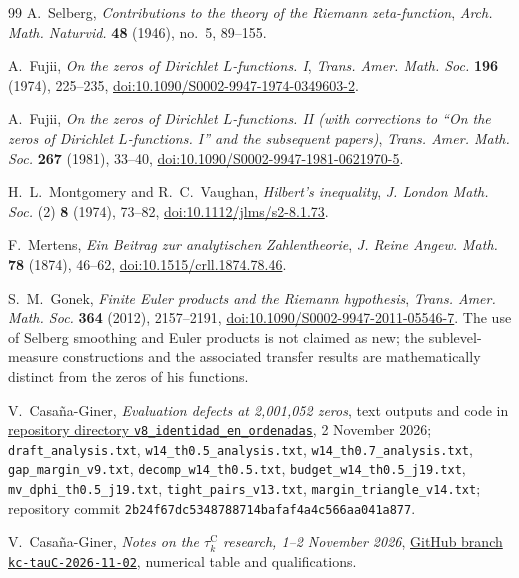 \documentclass[11pt,a4paper]{article}
\numberwithin{equation}{section}
\theoremstyle{definition}
\theoremstyle{remark}
\begin{document}
\begin{thebibliography}{99}
A.~Selberg, \emph{Contributions to the theory of the Riemann zeta-function}, \emph{Arch. Math. Naturvid.} \textbf{48} (1946), no.~5, 89--155.

A.~Fujii, \emph{On the zeros of Dirichlet $L$-functions. I}, \emph{Trans. Amer. Math. Soc.} \textbf{196} (1974), 225--235, \href{https://doi.org/10.1090/S0002-9947-1974-0349603-2}{doi:10.1090/S0002-9947-1974-0349603-2}.

A.~Fujii, \emph{On the zeros of Dirichlet $L$-functions. II (with corrections to ``On the zeros of Dirichlet $L$-functions. I'' and the subsequent papers)}, \emph{Trans. Amer. Math. Soc.} \textbf{267} (1981), 33--40, \href{https://doi.org/10.1090/S0002-9947-1981-0621970-5}{doi:10.1090/S0002-9947-1981-0621970-5}.

H.~L.~Montgomery and R.~C.~Vaughan, \emph{Hilbert's inequality}, \emph{J. London Math. Soc.} (2) \textbf{8} (1974), 73--82, \href{https://doi.org/10.1112/jlms/s2-8.1.73}{doi:10.1112/jlms/s2-8.1.73}.

F.~Mertens, \emph{Ein Beitrag zur analytischen Zahlentheorie}, \emph{J. Reine Angew. Math.} \textbf{78} (1874), 46--62, \href{https://doi.org/10.1515/crll.1874.78.46}{doi:10.1515/crll.1874.78.46}.

S.~M.~Gonek, \emph{Finite Euler products and the Riemann hypothesis},
\emph{Trans. Amer. Math. Soc.} \textbf{364} (2012), 2157--2191,
\href{https://doi.org/10.1090/S0002-9947-2011-05546-7}{doi:10.1090/S0002-9947-2011-05546-7}.
The use of Selberg smoothing and Euler products is not claimed as new;
the sublevel-measure constructions and the associated transfer results
are mathematically distinct from the zeros of his functions.

V.~Casa\~na-Giner, \emph{Evaluation defects at 2,001,052 zeros},
text outputs and code in
\href{https://github.com/vcasana1/prueba/tree/kc-tauC-2026-11-02/KC_tauC_2026-11-02/v8_identidad_en_ordenadas}{repository directory \texttt{v8\_identidad\_en\_ordenadas}},
2 November 2026; \texttt{draft\_analysis.txt},
\texttt{w14\_th0.5\_analysis.txt}, \texttt{w14\_th0.7\_analysis.txt},
\texttt{gap\_margin\_v9.txt}, \texttt{decomp\_w14\_th0.5.txt},
\texttt{budget\_w14\_th0.5\_j19.txt}, \texttt{mv\_dphi\_th0.5\_j19.txt},
\texttt{tight\_pairs\_v13.txt}, \texttt{margin\_triangle\_v14.txt};
repository commit \texttt{2b24f67dc5348788714bafaf4a4c566aa041a877}.

V.~Casa\~na-Giner, \emph{Notes on the $\tau_k^{\mathrm C}$ research, 1--2 November 2026}, \href{https://github.com/vcasana1/prueba/blob/kc-tauC-2026-11-02/KC_tauC_2026-11-02/NOTAS_investigacion.md}{GitHub branch \texttt{kc-tauC-2026-11-02}}, numerical table and qualifications.


\end{thebibliography}
\end{document}
